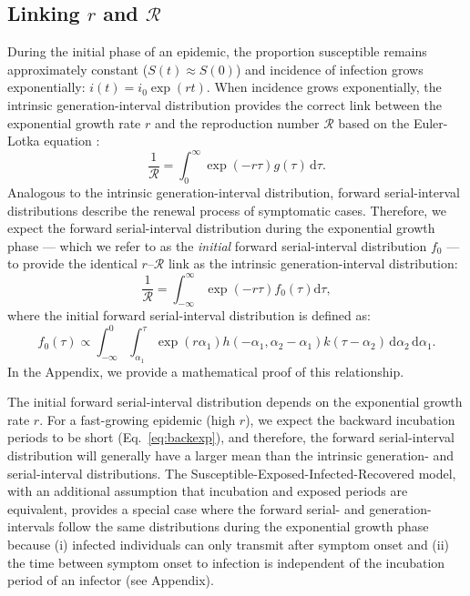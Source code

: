 \documentclass[12pt]{article}
\newcommand{\eref}[1]{Eq.~\ref{eq:#1}}
\newcommand{\RR}{\ensuremath{{\mathcal R}}\xspace}
\newcommand{\dd}[1]{\ensuremath{\, \mathrm{d}#1}}
\newcommand{\dtau}{\dd{\tau}}
\begin{document}
\subsection{Linking $r$ and \RR}

During the initial phase of an epidemic, the proportion susceptible remains approximately constant ($S(t) \approx S(0)$) and incidence of infection grows exponentially: $i(t)=i_0\exp(rt)$.
When incidence grows exponentially, the intrinsic generation-interval distribution provides the correct link between the exponential growth rate $r$ and the reproduction number \RR based on the Euler-Lotka equation \citep{wallinga2007generation}:
\begin{equation}
\frac{1}{\RR} = \int_0^\infty \exp(-r\tau) g(\tau) \dtau.
\end{equation}
Analogous to the intrinsic generation-interval distribution, 
forward serial-interval distributions describe the renewal process of symptomatic cases.
Therefore, we expect the forward serial-interval distribution during the exponential growth phase --- which we refer to as the \emph{initial} forward serial-interval distribution $f_0$ --- to provide the identical $r$--\RR link as the intrinsic generation-interval distribution:
\begin{equation}
\frac{1}{\RR} = \int_{-\infty}^\infty \exp(-r\tau) f_{0}(\tau) \mathrm{d} \tau,
\end{equation}
where the initial forward serial-interval distribution is defined as:
\begin{equation}
f_{0}(\tau) \propto \int_{-\infty}^{0} \int_{\alpha_1}^{\tau} \exp(r \alpha_1) h(-\alpha_1, \alpha_2 - \alpha_1) k(\tau - \alpha_2) \, \mathrm{d}\alpha_2\,\mathrm{d}\alpha_1.
\end{equation}
In the Appendix, we provide a mathematical proof of this relationship.

The initial forward serial-interval distribution depends on the exponential growth rate $r$.
For a fast-growing epidemic (high $r$), we expect the backward incubation periods to be short (\eref{backexp}), and therefore, the forward serial-interval distribution will generally have a larger mean than the intrinsic generation- and serial-interval distributions.
The Susceptible-Exposed-Infected-Recovered model, with an additional assumption that incubation and exposed periods are equivalent, provides a special case where the forward serial- and generation-intervals follow the same distributions during the exponential growth phase because (i) infected individuals can only transmit after symptom onset and (ii) the time between symptom onset to infection is independent of the incubation period of an infector (see Appendix).
\end{document}
